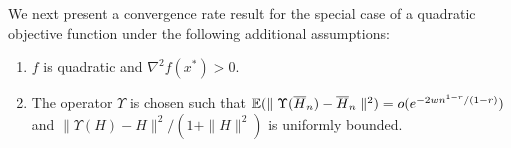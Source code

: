 
We next present a convergence rate result for the special case of a quadratic objective function under the following additional assumptions:
\begin{enumerate}[label=(\textbf{C\arabic*}),resume]
\item  $f$ is quadratic and $\nabla^2 f(x^*) > 0$. 
\item The operator $\Upsilon$ is chosen such that $\mathbb{E}(\parallel \Upsilon(\overline H_n) - \overline H_n\parallel^2) = o(e^{-2wn^{1-r}/(1-r)})$ and $\parallel \Upsilon(H) - H \parallel^2 / (1+\parallel H \parallel^2)$ is uniformly bounded.
\end{enumerate}

